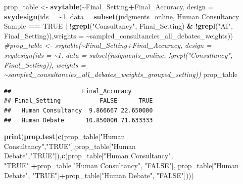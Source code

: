 \documentclass[
]{article}
\newenvironment{Shaded}{\begin{snugshade}}{\end{snugshade}}
\newcommand{\AttributeTok}[1]{\textcolor[rgb]{0.13,0.29,0.53}{#1}}
\newcommand{\CommentTok}[1]{\textcolor[rgb]{0.56,0.35,0.01}{\textit{#1}}}
\newcommand{\ConstantTok}[1]{\textcolor[rgb]{0.56,0.35,0.01}{#1}}
\newcommand{\DecValTok}[1]{\textcolor[rgb]{0.00,0.00,0.81}{#1}}
\newcommand{\FunctionTok}[1]{\textcolor[rgb]{0.13,0.29,0.53}{\textbf{#1}}}
\newcommand{\NormalTok}[1]{#1}
\newcommand{\OtherTok}[1]{\textcolor[rgb]{0.56,0.35,0.01}{#1}}
\newcommand{\SpecialCharTok}[1]{\textcolor[rgb]{0.81,0.36,0.00}{\textbf{#1}}}
\newcommand{\StringTok}[1]{\textcolor[rgb]{0.31,0.60,0.02}{#1}}
\begin{document}
\begin{Shaded}
\begin{Highlighting}[]
\NormalTok{prop\_table }\OtherTok{\textless{}{-}} \FunctionTok{svytable}\NormalTok{(}\SpecialCharTok{\textasciitilde{}}\NormalTok{Final\_Setting}\SpecialCharTok{+}\NormalTok{Final\_Accuracy, }\AttributeTok{design =} \FunctionTok{svydesign}\NormalTok{(}\AttributeTok{ids =} \SpecialCharTok{\textasciitilde{}}\DecValTok{1}\NormalTok{, }\AttributeTok{data =} \FunctionTok{subset}\NormalTok{(judgments\_online, }\StringTok{\textasciigrave{}}\AttributeTok{Human Consultancy Sample}\StringTok{\textasciigrave{}} \SpecialCharTok{==} \ConstantTok{TRUE} \SpecialCharTok{|} \SpecialCharTok{!}\FunctionTok{grepl}\NormalTok{(}\StringTok{"Consultancy"}\NormalTok{, Final\_Setting) }\SpecialCharTok{\&} \SpecialCharTok{!}\FunctionTok{grepl}\NormalTok{(}\StringTok{"AI"}\NormalTok{, Final\_Setting)),}\AttributeTok{weights =} \SpecialCharTok{\textasciitilde{}}\NormalTok{sampled\_consultancies\_all\_debates\_weights))}
\CommentTok{\#prop\_table \textless{}{-} svytable(\textasciitilde{}Final\_Setting+Final\_Accuracy, design = svydesign(ids = \textasciitilde{}1, data = subset(judgments\_online, !grepl("Consultancy", Final\_Setting)), weights = \textasciitilde{}sampled\_consultancies\_all\_debates\_weights\_grouped\_setting))}
\NormalTok{prop\_table}
\end{Highlighting}
\end{Shaded}

\begin{verbatim}
##                    Final_Accuracy
## Final_Setting           FALSE      TRUE
##   Human Consultancy  9.866667 22.650000
##   Human Debate      10.850000 71.633333
\end{verbatim}

\begin{Shaded}
\begin{Highlighting}[]
\FunctionTok{print}\NormalTok{(}\FunctionTok{prop.test}\NormalTok{(}\FunctionTok{c}\NormalTok{(prop\_table[}\StringTok{"Human Consultancy"}\NormalTok{,}\StringTok{"TRUE"}\NormalTok{],prop\_table[}\StringTok{"Human Debate"}\NormalTok{,}\StringTok{"TRUE"}\NormalTok{]),}\FunctionTok{c}\NormalTok{(prop\_table[}\StringTok{"Human Consultancy"}\NormalTok{, }\StringTok{"TRUE"}\NormalTok{]}\SpecialCharTok{+}\NormalTok{prop\_table[}\StringTok{"Human Consultancy"}\NormalTok{, }\StringTok{"FALSE"}\NormalTok{], prop\_table[}\StringTok{"Human Debate"}\NormalTok{, }\StringTok{"TRUE"}\NormalTok{]}\SpecialCharTok{+}\NormalTok{prop\_table[}\StringTok{"Human Debate"}\NormalTok{, }\StringTok{"FALSE"}\NormalTok{])))}
\end{Highlighting}
\end{Shaded}
\end{document}
